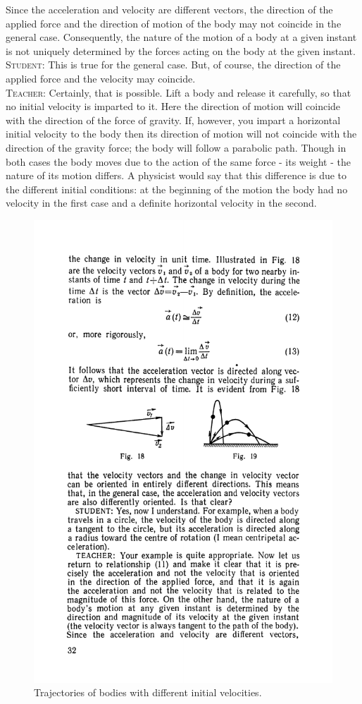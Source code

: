 \documentclass[a4paper,sfsidenotes]{tufte-book}
\begin{document}
Since the acceleration and velocity are different vectors, the direction of the applied force and the direction of motion of the body may not coincide in the general case. Consequently, the nature of the motion of a body at a given instant is not uniquely determined by the forces acting on the body at
the given instant.\\
\textsc{Student:} This is true for the general case. But, of course, the direction of the applied force and the velocity may coincide.\\
\textsc{Teacher:} Certainly, that is possible. Lift a body and release it carefully, so that no initial velocity is imparted to it. Here the direction of motion will coincide with the direction of the force of gravity. If, however, you impart a horizontal initial velocity to the body then its direction of
motion will not coincide with the direction of the gravity force; the body will follow a parabolic path. Though in both cases the body moves due to the action of the same force - its weight - the nature of its motion differs. A physicist would say that this difference is due to the different initial conditions: at
the beginning of the motion the body had no velocity in the first case and a definite horizontal velocity in the second.
\begin{figure}
\centering
\includegraphics[width=0.55\linewidth]{fig-019a.pdf}
\caption{Trajectories of bodies with different initial velocities.}
\label{fig-19}
\end{figure}
\end{document}
